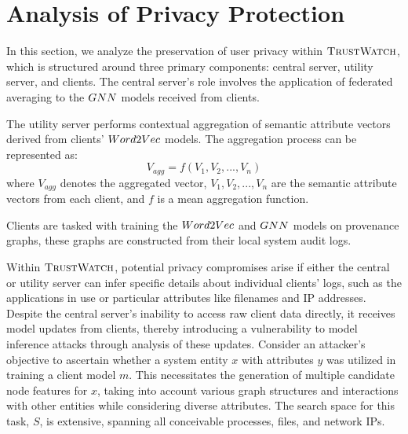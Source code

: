 \section{Analysis of Privacy Protection}
\label{privacy}







In this section, we analyze the preservation of user privacy within \(\relax{\textsc{TrustWatch}}\), which is structured around three primary components: central server, utility server, and clients. The central server's role involves the application of federated averaging to the \(GNN\) models received from clients.

The utility server performs contextual aggregation of semantic attribute vectors derived from clients' \(Word2Vec\) models. The aggregation process can be represented as:
\[ V_{agg} = f(V_1, V_2, ..., V_n) \]
where \(V_{agg}\) denotes the aggregated vector, \(V_1, V_2, ..., V_n\) are the semantic attribute vectors from each client, and \(f\) is a mean aggregation function.

Clients are tasked with training the \(Word2Vec\) and \(GNN\) models on provenance graphs, these graphs are constructed from their local system audit logs. 

Within \(\relax{\textsc{TrustWatch}}\), potential privacy compromises arise if either the central or utility server can infer specific details about individual clients' logs, such as the applications in use or particular attributes like filenames and IP addresses. Despite the central server's inability to access raw client data directly, it receives model updates from clients, thereby introducing a vulnerability to model inference attacks through analysis of these updates. Consider an attacker's objective to ascertain whether a system entity \(x\) with attributes \(y\) was utilized in training a client model \(m\). This necessitates the generation of multiple candidate node features for \(x\), taking into account various graph structures and interactions with other entities while considering diverse attributes. The search space for this task, \(S\), is extensive, spanning all conceivable processes, files, and network IPs. 

